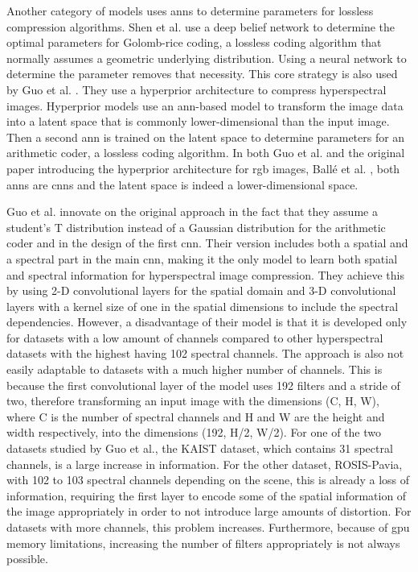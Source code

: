 Another category of models uses \acp{ann} to determine parameters for lossless compression algorithms. Shen et al. \citep{shen_golomb-rice_2017} use a deep belief network to determine the optimal parameters for Golomb-rice coding, a lossless coding algorithm that normally assumes a geometric underlying distribution. Using a neural network to determine the parameter removes that necessity.
This core strategy is also used by Guo et al. \citep{guo_learned_2021}. They use a hyperprior architecture to compress hyperspectral images. Hyperprior models use an \ac{ann}-based model to transform the image data into a latent space that is commonly lower-dimensional than the input image. Then a second \ac{ann} is trained on the latent space to determine parameters for an arithmetic coder, a lossless coding algorithm. In both Guo et al. and the original paper introducing the hyperprior architecture for \ac{rgb} images, Ballé et al. \citep{balle_end--end_2017}, both \acp{ann} are \acp{cnn} and the latent space is indeed a lower-dimensional space.

Guo et al. innovate on the original approach in the fact that they assume a student's T distribution instead of a Gaussian distribution for the arithmetic coder and in the design of the first \ac{cnn}. Their version includes both a spatial and a spectral part in the main \ac{cnn}, making it the only model to learn both spatial and spectral information for hyperspectral image compression. They achieve this by using 2-D convolutional layers for the spatial domain and 3-D convolutional layers with a kernel size of one in the spatial dimensions to include the spectral dependencies. However, a disadvantage of their model is that it is developed only for datasets with a low amount of channels compared to other hyperspectral datasets with the highest having 102 spectral channels. The approach is also not easily adaptable to datasets with a much higher number of channels. This is because the first convolutional layer of the model uses 192 filters and a stride of two, therefore transforming an input image with the dimensions (C, H, W), where C is the number of spectral channels and H and W are the height and width respectively, into the dimensions (192, H/2, W/2). For one of the two datasets studied by Guo et al., the KAIST dataset, which contains 31 spectral channels, is a large increase in information. For the other dataset, ROSIS-Pavia, with 102 to 103 spectral channels depending on the scene, this is already a loss of information, requiring the first layer to encode some of the spatial information of the image appropriately in order to not introduce large amounts of distortion. For datasets with more channels, this problem increases. Furthermore, because of \ac{gpu} memory limitations, increasing the number of filters appropriately is not always possible.

